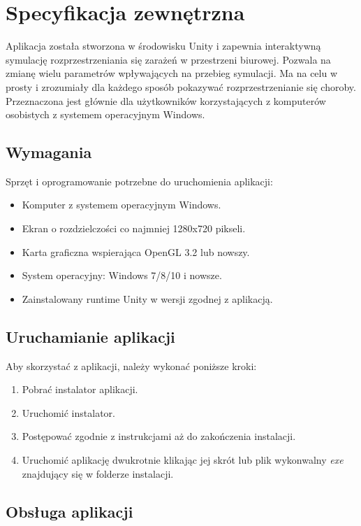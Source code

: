 \chapter{Specyfikacja zewnętrzna}
\label{ch:04}

Aplikacja została stworzona w środowisku Unity i zapewnia interaktywną symulację rozprzestrzeniania się zarażeń w przestrzeni biurowej. Pozwala na zmianę wielu parametrów wpływających na przebieg symulacji. Ma na celu w prosty i zrozumiały dla każdego sposób pokazywać rozprzestrzenianie się choroby. Przeznaczona jest głównie dla użytkowników korzystających z komputerów osobistych z systemem operacyjnym Windows.

\section{Wymagania}

Sprzęt i oprogramowanie potrzebne do uruchomienia aplikacji:
\begin{itemize}
	\item Komputer z systemem operacyjnym Windows.
	\item Ekran o rozdzielczości co najmniej 1280x720 pikseli.
	\item Karta graficzna wspierająca OpenGL 3.2 lub nowszy.
	\item System operacyjny: Windows 7/8/10 i nowsze.
	\item Zainstalowany runtime Unity w wersji zgodnej z aplikacją.
\end{itemize}

\section{Uruchamianie aplikacji}

Aby skorzystać z aplikacji, należy wykonać poniższe kroki:

\begin{enumerate}
	\item Pobrać instalator aplikacji.
	\item Uruchomić instalator.
	\item Postępować zgodnie z instrukcjami aż do zakończenia instalacji.
	\item Uruchomić aplikację dwukrotnie klikając jej skrót lub plik wykonwalny \textit{exe} znajdujący się w folderze instalacji.
\end{enumerate}

\section{Obsługa aplikacji}

